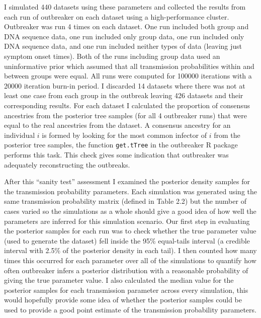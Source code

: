 \documentclass[11pt,a4paper]{report}
\begin{document}
I simulated 440 datasets using these parameters and collected the results from each run of outbreaker on each dataset using a high-performance cluster. Outbreaker was run 4 times on each dataset. One run included both group and DNA sequence data, one run included only group data, one run included only DNA sequence data, and one run included neither types of data (leaving just symptom onset times). Both of the runs including group data used an uninformative prior which assumed that all transmission probabilities within and between groups were equal. All runs were computed for 100000 iterations with a 20000 iteration burn-in period. I discarded 14 datasets where there was not at least one case from each group in the outbreak leaving 426 datasets and their corresponding results. For each dataset I calculated the proportion of consensus ancestries from the posterior tree samples (for all 4 outbreaker runs) that were equal to the real ancestries from the dataset. A consensus ancestry for an individual $i$ is formed by looking for the most common infector of $i$ from the posterior tree samples, the function {\tt get.tTree} in the outbreaker R package performs this task. This check gives some indication that outbreaker was adequately reconstructing the outbreaks.

After this ``sanity test'' assessment I examined the posterior density samples for the transmission probability parameters. Each simulation was generated using the same transmission probability matrix (defined in Table 2.2) but the number of cases varied so the simulations as a whole should give a good idea of how well the parameters are inferred for this simulation scenario. Our first step in evaluating the posterior samples for each run was to check whether the true parameter value (used to generate the dataset) fell inside the 95\% equal-tails interval (a credible interval with 2.5\% of the posterior density in each tail). I then counted how many times this occurred for each parameter over all of the simulations to quantify how often outbreaker infers a posterior distribution with a reasonable probability of giving the true parameter value. I also calculated the median value for the posterior samples for each transmission parameter across every simulation, this would hopefully provide some idea of whether the posterior samples could be used to provide a good point estimate of the transmission probability parameters.
\end{document}

